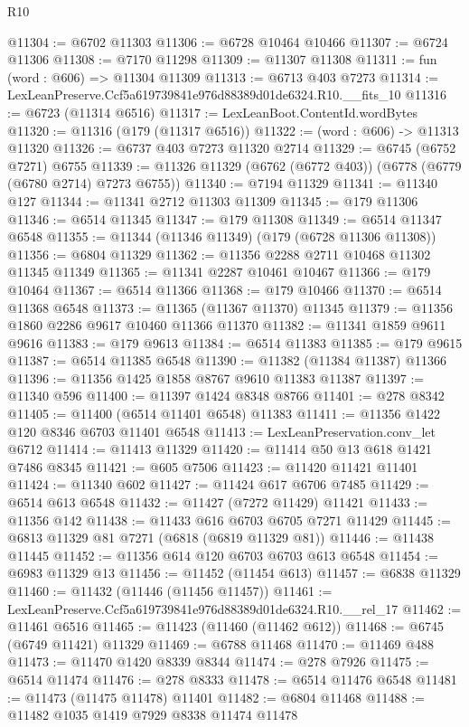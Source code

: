 \begin{lexlean}{R10}
\begin{coremodule}
@11304 := @6702 @11303
@11306 := @6728 @10464 @10466
@11307 := @6724 @11306
@11308 := @7170 @11298
@11309 := @11307 @11308
@11311 := fun (word : @606) => @11304 @11309
@11313 := @6713 @403 @7273
@11314 := LexLeanPreserve.Ccf5a619739841e976d88389d01de6324.R10.__fits_10
@11316 := @6723 (@11314 @6516)
@11317 := LexLeanBoot.ContentId.wordBytes
@11320 := @11316 (@179 (@11317 @6516))
@11322 := (word : @606) -> @11313 @11320
@11326 := @6737 @403 @7273 @11320 @2714
@11329 := @6745 (@6752 @7271) @6755
@11339 := @11326 @11329 (@6762 (@6772 @403)) (@6778 (@6779 (@6780 @2714) @7273 @6755))
@11340 := @7194 @11329
@11341 := @11340 @127
@11344 := @11341 @2712 @11303 @11309
@11345 := @179 @11306
@11346 := @6514 @11345
@11347 := @179 @11308
@11349 := @6514 @11347 @6548
@11355 := @11344 (@11346 @11349) (@179 (@6728 @11306 @11308))
@11356 := @6804 @11329
@11362 := @11356 @2288 @2711 @10468 @11302 @11345 @11349
@11365 := @11341 @2287 @10461 @10467
@11366 := @179 @10464
@11367 := @6514 @11366
@11368 := @179 @10466
@11370 := @6514 @11368 @6548
@11373 := @11365 (@11367 @11370) @11345
@11379 := @11356 @1860 @2286 @9617 @10460 @11366 @11370
@11382 := @11341 @1859 @9611 @9616
@11383 := @179 @9613
@11384 := @6514 @11383
@11385 := @179 @9615
@11387 := @6514 @11385 @6548
@11390 := @11382 (@11384 @11387) @11366
@11396 := @11356 @1425 @1858 @8767 @9610 @11383 @11387
@11397 := @11340 @596
@11400 := @11397 @1424 @8348 @8766
@11401 := @278 @8342
@11405 := @11400 (@6514 @11401 @6548) @11383
@11411 := @11356 @1422 @120 @8346 @6703 @11401 @6548
@11413 := LexLeanPreservation.conv_let @6712
@11414 := @11413 @11329
@11420 := @11414 @50 @13 @618 @1421 @7486 @8345
@11421 := @605 @7506
@11423 := @11420 @11421 @11401
@11424 := @11340 @602
@11427 := @11424 @617 @6706 @7485
@11429 := @6514 @613 @6548
@11432 := @11427 (@7272 @11429) @11421
@11433 := @11356 @142
@11438 := @11433 @616 @6703 @6705 @7271 @11429
@11445 := @6813 @11329 @81 @7271 (@6818 (@6819 @11329 @81))
@11446 := @11438 @11445
@11452 := @11356 @614 @120 @6703 @6703 @613 @6548
@11454 := @6983 @11329 @13
@11456 := @11452 (@11454 @613)
@11457 := @6838 @11329
@11460 := @11432 (@11446 (@11456 @11457))
@11461 := LexLeanPreserve.Ccf5a619739841e976d88389d01de6324.R10.__rel_17
@11462 := @11461 @6516
@11465 := @11423 (@11460 (@11462 @612))
@11468 := @6745 (@6749 @11421) @11329
@11469 := @6788 @11468
@11470 := @11469 @488
@11473 := @11470 @1420 @8339 @8344
@11474 := @278 @7926
@11475 := @6514 @11474
@11476 := @278 @8333
@11478 := @6514 @11476 @6548
@11481 := @11473 (@11475 @11478) @11401
@11482 := @6804 @11468
@11488 := @11482 @1035 @1419 @7929 @8338 @11474 @11478

\end{coremodule}
\end{lexlean}
